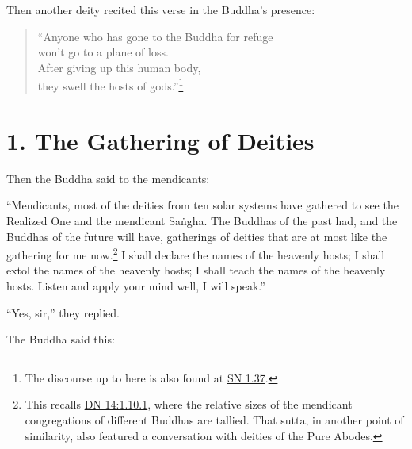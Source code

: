 \documentclass[12pt,openany]{book}%
\begin{document}
Then another deity recited this verse in the Buddha’s presence: 

\begin{verse}%
“Anyone who has gone to the Buddha for refuge \\
won’t go to a plane of loss. \\
After giving up this human body, \\
they swell the hosts of gods.”\footnote{The discourse up to here is also found at \href{https://suttacentral.net/sn1.37/en/sujato}{SN 1.37}. } 

%
\end{verse}

\section*{1. The Gathering of Deities }

Then the Buddha said to the mendicants: 

“Mendicants, most of the deities from ten solar systems have gathered to see the Realized One and the mendicant \textsanskrit{Saṅgha}. The Buddhas of the past had, and the Buddhas of the future will have, gatherings of deities that are at most like the gathering for me now.\footnote{This recalls \href{https://suttacentral.net/dn14/en/sujato\#1.10.1}{DN 14:1.10.1}, where the relative sizes of the mendicant congregations of different Buddhas are tallied. That sutta, in another point of similarity, also featured a conversation with deities of the Pure Abodes. } I shall declare the names of the heavenly hosts; I shall extol the names of the heavenly hosts; I shall teach the names of the heavenly hosts. Listen and apply your mind well, I will speak.” 

“Yes, sir,” they replied. 

The Buddha said this: 
\end{document}
